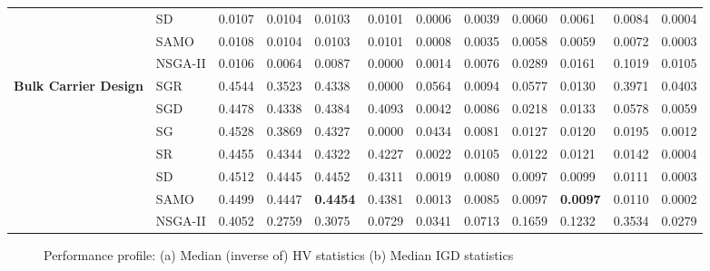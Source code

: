 \begin{table*}[!htb]
\begin{tabular}{|l|l|l|l|l|l|l|l|l|l|l|l|}
		& SD                  & 0.0107         & 0.0104         & 0.0103           & 0.0101          & 0.0006           & 0.0039         & 0.0060         & 0.0061           & 0.0084          & 0.0004              \\ 
		& SAMO                & 0.0108         & 0.0104         & 0.0103           & 0.0101          & 0.0008         & 0.0035         & 0.0058         & 0.0059           & 0.0072          & 0.0003               \\ 
		& NSGA-II             & 0.0106         & 0.0064         & 0.0087           & 0.0000          & 0.0014        & 0.0076         & 0.0289         & 0.0161           & 0.1019          & 0.0105              \\ \hline
		\multirow{7}{*}{\textbf{Bulk Carrier Design}}                             & SGR                 & 0.4544     & 0.3523     & 0.4338       & 0.0000      & 0.0564      & 0.0094     & 0.0577     & 0.0130       & 0.3971      & 0.0403        \\ 
		& SGD                 & 0.4478     & 0.4338     & 0.4384       & 0.4093      & 0.0042           & 0.0086     & 0.0218     & 0.0133       & 0.0578      & 0.0059           \\ 
		& SG                  & 0.4528     & 0.3869     & 0.4327       & 0.0000      & 0.0434           & 0.0081     & 0.0127     & 0.0120       & 0.0195      & 0.0012          \\ 
		& SR                  & 0.4455     & 0.4344     & 0.4322       & 0.4227      & 0.0022             & 0.0105     & 0.0122     & 0.0121       & 0.0142      & 0.0004           \\ 
		& SD                  & 0.4512     & 0.4445     & 0.4452       & 0.4311      & 0.0019       & 0.0080     & 0.0097     & 0.0099       & 0.0111      & 0.0003        \\ 
		& SAMO                & 0.4499     & 0.4447     & \textbf{0.4454}       & 0.4381      & 0.0013      & 0.0085     & 0.0097     & \textbf{0.0097}       & 0.0110      & 0.0002         \\ 
		& NSGA-II             & 0.4052     & 0.2759     & 0.3075       & 0.0729      & 0.0341       & 0.0713     & 0.1659     & 0.1232       & 0.3534      & 0.0279             \\ \hline
	\end{tabular}
	\label{tab:hvigdstat2}
\end{table*}


\begin{figure*}[ht]
	\centering
	\qquad
	\caption{Performance profile: (a) Median (inverse of) HV statistics (b) Median IGD statistics}
	\label{fig:Perfprofile}
\end{figure*}


